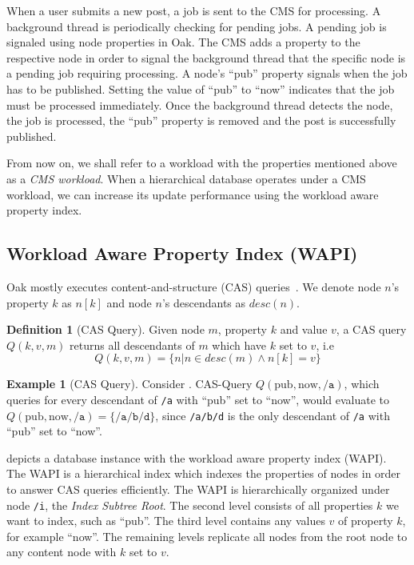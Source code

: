 \documentclass[abstracton,12pt]{scrartcl}
\theoremstyle{definition}
\newtheorem{definition}{Definition}
\newtheorem{example}{Example}
\begin{document}
When a user submits a new post, a job is sent to the CMS for processing. %
A background thread is periodically checking for pending
jobs. A pending job is signaled using node properties in Oak.
The CMS adds a property to the respective node in
order to signal the background thread that the specific node is a pending job requiring
processing. A node's ``pub'' property signals when the job has to be published.
Setting the value of ``pub'' to ``now'' indicates that the job must be processed
immediately.
Once the background thread detects the node, the job is processed, the ``pub''
property is removed and the post is successfully published.

From now on, we shall refer to a workload with the properties mentioned above as
a \textit{CMS workload}. When a hierarchical database operates under a CMS
workload, we can increase its update performance using the workload aware
property index.

\subsection{Workload Aware Property Index (WAPI)}
\label{sec:wapi}

Oak mostly executes content-and-structure (CAS) queries~\cite{CM15}.
We denote node $n$'s property $k$ as $n[k]$ and node $n$'s descendants as
$desc(n)$.

\begin{definition}[CAS Query]
  Given node $m$, property $k$ and value $v$, a CAS query
  $Q(k,v,m)$ returns all descendants of $m$ which have $k$ set to $v$, i.e
  $$ Q(k,v,m) = \{ n | n \in desc(m) \land n[k] = v\} $$
  \label{def:cas-query}
\end{definition}

\begin{example}[CAS Query]
  Consider . CAS-Query $Q(\text{pub},\text{now},\texttt{/a})$,
  which queries for every descendant of \texttt{/a} with
  ``pub'' set to ``now'', would evaluate to $Q(\text{pub},\text{now},\texttt{/a}) = \{\texttt{/a/b/d}\}$,
  since \texttt{/a/b/d} is the only descendant of \texttt{/a} with ``pub'' set
  to ``now''.
  \label{ex:cas_query}
\end{example}

 depicts a database instance with the workload aware
property index (WAPI).
The WAPI is a hierarchical index which indexes the properties of nodes in order
to answer CAS queries efficiently.
The WAPI is hierarchically organized under node \texttt{/i}, the
\textit{Index Subtree Root}.
The second level consists of all properties $k$ we want
to index, such as ``pub''.
The third level contains any values $v$ of property $k$, for example
``now''.
The remaining levels replicate all nodes from the root node to any
content node with $k$ set to $v$.
\end{document}
